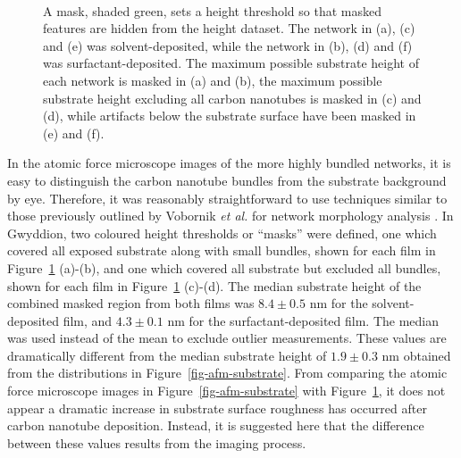 \documentclass[
  a4paper,
]{scrbook}
\begin{document}
\begin{figure}
\begin{minipage}[t]{0.01\linewidth}
{\centering 

~

}

\end{minipage}%

\caption{\label{fig-cnt-mask}A mask, shaded green, sets a height
threshold so that masked features are hidden from the height dataset.
The network in (a), (c) and (e) was solvent-deposited, while the network
in (b), (d) and (f) was surfactant-deposited. The maximum possible
substrate height of each network is masked in (a) and (b), the maximum
possible substrate height excluding all carbon nanotubes is masked in
(c) and (d), while artifacts below the substrate surface have been
masked in (e) and (f).}

\end{figure}

In the atomic force microscope images of the more highly bundled
networks, it is easy to distinguish the carbon nanotube bundles from the
substrate background by eye. Therefore, it was reasonably
straightforward to use techniques similar to those previously outlined
by Vobornik \emph{et al.} for network morphology analysis
\autocite{Vobornik2023}. In Gwyddion, two coloured height thresholds or
``masks'' were defined, one which covered all exposed substrate along
with small bundles, shown for each film in Figure~\ref{fig-cnt-mask}
(a)-(b), and one which covered all substrate but excluded all bundles,
shown for each film in Figure~\ref{fig-cnt-mask} (c)-(d). The median
substrate height of the combined masked region from both films was
\(8.4 \pm 0.5\) nm for the solvent-deposited film, and \(4.3 \pm 0.1\)
nm for the surfactant-deposited film. The median was used instead of the
mean to exclude outlier measurements. These values are dramatically
different from the median substrate height of \(1.9 \pm 0.3\) nm
obtained from the distributions in Figure~\ref{fig-afm-substrate}. From
comparing the atomic force microscope images in
Figure~\ref{fig-afm-substrate} with Figure~\ref{fig-cnt-mask}, it does
not appear a dramatic increase in substrate surface roughness has
occurred after carbon nanotube deposition. Instead, it is suggested here
that the difference between these values results from the imaging
process.
\end{document}
